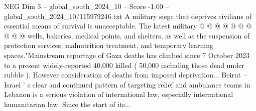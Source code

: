 \begin{textsample}{NEG Dim 3 – global\_south\_2024\_10 – Score -1.00 – global\_south\_2024\_10/115979246.txt}
A military siege that deprives civilians of essential means of survival is unacceptable.
The latest military @ @ @ @ @ @ @ @ @ @ wells, bakeries, medical points, and shelters, as well as the suspension of protection services, malnutrition treatment, and temporary learning spaces."Mainstream reportage of Gaza deaths has climbed since 7 October 2023 to a present widely-reported 40,000 killed ( 50,000 including those dead under rubble ).
However consideration of deaths from imposed deprivation...
Beirut -- Israel ' s clear and continued pattern of targeting relief and ambulance teams in Lebanon is a serious violation of international law, especially international humanitarian law.
Since the start of its...

\end{textsample}
